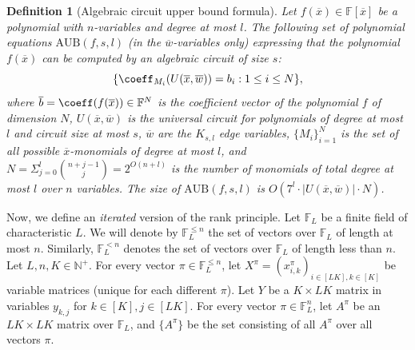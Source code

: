 \documentclass[11pt,letter]{article}
\newtheorem{definition}[theorem]{Definition}
\theoremstyle{remark} %
\newcommand{\AUB}{\mathrm{AUB}} %
\newcommand{\F}{\mathbb{F}}
\begin{document}
{    \begin{definition}[Algebraic circuit upper bound formula]
        \label{def: Algebraic circuit upper bound formula}
         Let $f(\overline{x})\in \mathbb{F}[\overline{x}]$ be a polynomial with $n$-variables and degree at most $l$. The following set of polynomial equations $\AUB(f,s,l)$ (in the $\overline{w}$-variables only) expressing that the polynomial $f(\overline{x})$ can be computed by an algebraic circuit of size $s$: 
         \[
            \{\coeff_{M_i} (U(\overline{x},\overline{w})) = b_i : 1\leq i \leq N\},
        \]
        where $\overline{b}=\coeff(f(\overline{x})) \in \mathbb{F}^N$ is the coefficient vector of the polynomial $f$ of dimension $N$, $U(\overline{x},\overline{w})$ is the universal circuit for polynomials of degree at most $l$ and circuit size at most $s$, $\overline{w}$ are the $K_{s,l}$ edge variables, $\{M_i\}_{i=1}^N$ is the set of all possible $\overline{x}$-monomials of degree at most $l$, and $N=\Sigma_{j=0}^l \binom{n+j-1}{j}=2^{O(n+l)}$ is the number of monomials of total degree at most $l$ over $n$ variables. The size of $\AUB(f,s,l)$ is $O(7^l\cdot |U(\overline{x},\overline{w})| \cdot N)$.\par
    \end{definition}

    Now, we define an \emph{iterated} version of the rank principle. Let $\F_L$ be a finite field of characteristic $L$. We will denote by $\F_L^{\leq n}$ the set of vectors over $\F_L$ of length at most $n$. Similarly, $\F_L^{< n}$ denotes the set of vectors over $\F_L$ of length less than $n$. Let $L, n, K  \in \mathbb{N}^+$. For every vector $\pi \in \F_L^{\leq n}$, let $X^{\pi} = (x_{i,k}^\pi )_{i \in [LK], k \in [K]}$ be variable matrices (unique for each different $\pi$). Let $Y$ be a $K \times LK$ matrix in variables $y_{k,j}$ for $k \in [K], j \in [LK]$. For every vector $\pi \in \F_L^n$, let $A^\pi $ be an $LK \times LK$ matrix over $\F_L$, and $\{A^\pi\}$ be the set consisting of all $A^\pi$ over all vectors $\pi$.

}
\end{document}
